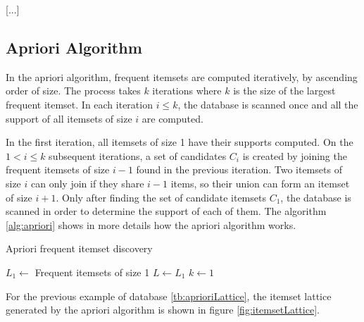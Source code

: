 [...]

\subsection{Apriori Algorithm}

In the apriori algorithm, frequent itemsets are computed iteratively, by ascending order of size. The process takes $k$
iterations where $k$ is the size of the largest frequent itemset. In each iteration $i \leq k$, the database is scanned
once and all the support of all itemsets of size $i$ are computed.

In the first iteration, all itemsets of size 1 have their supports computed. On the $1 < i \leq k$ subsequent
iterations, a set of candidates $C_i$ is created by joining the frequent itemsets of size $i-1$ found in the previous
iteration. Two itemsets of size $i$ can only join if they share $i-1$ items, so their union can form an itemset of size
$i+1$. Only after finding the set of candidate itemsets $C_1$, the database is scanned in order to determine the
support of each of them. The algorithm \ref{alg:apriori} shows in more details how the apriori algorithm works.

\begin{algorithm}[!h]
  \caption{Apriori frequent itemset discovery}
  \label{alg:apriori}

  $L_1 \leftarrow$ Frequent itemsets of size 1 \;
  $L \leftarrow L_1$ \;
  $k \leftarrow 1$ \;
   \;
\end{algorithm}

For the previous example of database \ref{tb:aprioriLattice}, the itemset lattice generated by the apriori algorithm
is shown in figure \ref{fig:itemsetLattice}. 


